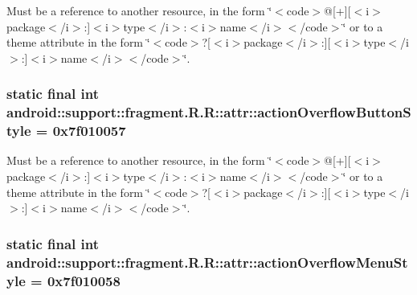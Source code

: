 Must be a reference to another resource, in the form \char`\"{}$<$code$>$@\mbox{[}+\mbox{]}\mbox{[}$<$i$>$package$<$/i$>$:\mbox{]}$<$i$>$type$<$/i$>$:$<$i$>$name$<$/i$>$$<$/code$>$\char`\"{} or to a theme attribute in the form \char`\"{}$<$code$>$?\mbox{[}$<$i$>$package$<$/i$>$:\mbox{]}\mbox{[}$<$i$>$type$<$/i$>$:\mbox{]}$<$i$>$name$<$/i$>$$<$/code$>$\char`\"{}. \hypertarget{classandroid_1_1support_1_1fragment_1_1_r_1_1attr_39adfecc0a5de4cfb4c35015ddfc4ce6}{
\subsubsection[{actionOverflowButtonStyle}]{\setlength{\rightskip}{0pt plus 5cm}static final int android::support::fragment.R.R::attr::actionOverflowButtonStyle = 0x7f010057}}
\label{classandroid_1_1support_1_1fragment_1_1_r_1_1attr_39adfecc0a5de4cfb4c35015ddfc4ce6}


Must be a reference to another resource, in the form \char`\"{}$<$code$>$@\mbox{[}+\mbox{]}\mbox{[}$<$i$>$package$<$/i$>$:\mbox{]}$<$i$>$type$<$/i$>$:$<$i$>$name$<$/i$>$$<$/code$>$\char`\"{} or to a theme attribute in the form \char`\"{}$<$code$>$?\mbox{[}$<$i$>$package$<$/i$>$:\mbox{]}\mbox{[}$<$i$>$type$<$/i$>$:\mbox{]}$<$i$>$name$<$/i$>$$<$/code$>$\char`\"{}. \hypertarget{classandroid_1_1support_1_1fragment_1_1_r_1_1attr_7795b4d227fc77f0bdf34f4a56807bdf}{
\subsubsection[{actionOverflowMenuStyle}]{\setlength{\rightskip}{0pt plus 5cm}static final int android::support::fragment.R.R::attr::actionOverflowMenuStyle = 0x7f010058}}
\label{classandroid_1_1support_1_1fragment_1_1_r_1_1attr_7795b4d227fc77f0bdf34f4a56807bdf}


